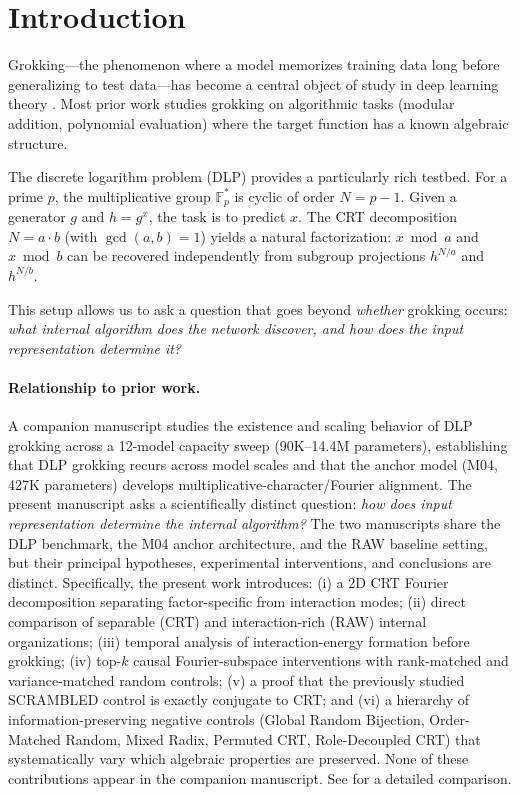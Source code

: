 \documentclass[11pt,a4paper]{article}
\theoremstyle{definition}
\theoremstyle{remark}
\newcommand{\Fp}{\mathbb{F}_p^*}
\begin{document}
\section{Introduction}

Grokking---the phenomenon where a model memorizes training data long before generalizing to test data---has become a central object of study in deep learning theory \citep{power2022grokking, nanda2023progress}. Most prior work studies grokking on algorithmic tasks (modular addition, polynomial evaluation) where the target function has a known algebraic structure.

The discrete logarithm problem (DLP) provides a particularly rich testbed. For a prime $p$, the multiplicative group $\Fp$ is cyclic of order $N = p-1$. Given a generator $g$ and $h = g^x$, the task is to predict $x$. The CRT decomposition $N = a \cdot b$ (with $\gcd(a,b)=1$) yields a natural factorization: $x \bmod a$ and $x \bmod b$ can be recovered independently from subgroup projections $h^{N/a}$ and $h^{N/b}$.

This setup allows us to ask a question that goes beyond \emph{whether} grokking occurs: \emph{what internal algorithm does the network discover, and how does the input representation determine it?}

\paragraph{Relationship to prior work.} A companion manuscript \citep{vesterlund2026grokking} studies the existence and scaling behavior of DLP grokking across a 12-model capacity sweep (90K--14.4M parameters), establishing that DLP grokking recurs across model scales and that the anchor model (M04, 427K parameters) develops multiplicative-character/Fourier alignment. The present manuscript asks a scientifically distinct question: \emph{how does input representation determine the internal algorithm?} The two manuscripts share the DLP benchmark, the M04 anchor architecture, and the RAW baseline setting, but their principal hypotheses, experimental interventions, and conclusions are distinct. Specifically, the present work introduces: (i) a 2D CRT Fourier decomposition separating factor-specific from interaction modes; (ii) direct comparison of separable (CRT) and interaction-rich (RAW) internal organizations; (iii) temporal analysis of interaction-energy formation before grokking; (iv) top-$k$ causal Fourier-subspace interventions with rank-matched and variance-matched random controls; (v) a proof that the previously studied SCRAMBLED control is exactly conjugate to CRT; and (vi) a hierarchy of information-preserving negative controls (Global Random Bijection, Order-Matched Random, Mixed Radix, Permuted CRT, Role-Decoupled CRT) that systematically vary which algebraic properties are preserved. None of these contributions appear in the companion manuscript. See  for a detailed comparison.
\end{document}
